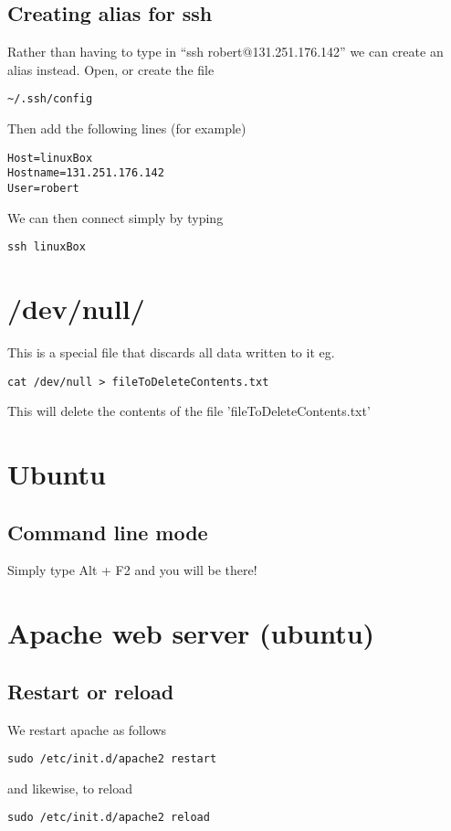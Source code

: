 \documentclass[a4paper, 10pt]{article}
\begin{document}
\subsection*{Creating alias for ssh}

Rather than having to type in ``ssh robert@131.251.176.142'' we can create an alias instead. Open, or create the file 
\begin{verbatim}
~/.ssh/config
\end{verbatim}
Then add the following lines (for example)
\begin{verbatim}
Host=linuxBox
Hostname=131.251.176.142
User=robert
\end{verbatim}
We can then connect simply by typing
\begin{verbatim}
ssh linuxBox
\end{verbatim}

\section*{/dev/null/}

This is a special file that discards all data written to it eg.
\begin{verbatim}
cat /dev/null > fileToDeleteContents.txt
\end{verbatim}
This will delete the contents of the file 'fileToDeleteContents.txt'

\section*{Ubuntu}

\subsection*{Command line mode}

Simply type Alt + F2 and you will be there!

\section*{Apache web server (ubuntu)}
\label{sec:apache-web-server}

\subsection*{Restart or reload}
\label{sec:restart-or-reload}

We restart apache as follows
\begin{verbatim}
sudo /etc/init.d/apache2 restart
\end{verbatim}
and likewise, to reload
\begin{verbatim}
sudo /etc/init.d/apache2 reload
\end{verbatim}
\end{document}
